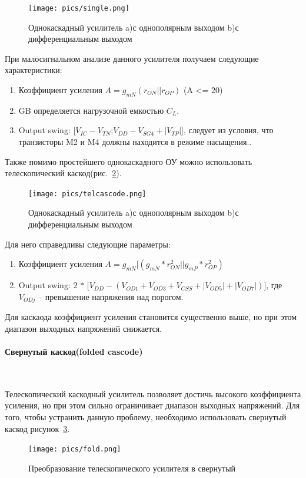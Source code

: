 \documentclass[a4paper,12pt,oneside]{scrartcl}
\begin{document}
\begin{figure}[!htb]
\centering
\texttt{[image: pics/single.png]}
\caption{Однокаскадный усилитель a)с однополярным выходом b)с дифференциальным выходом}
\label{fig:Single}
\end{figure}

При малосигнальном анализе данного усилителя получаем следующие характеристики:
\begin{enumerate}
    \item Коэффициент усиления $A = g_{mN}(r_{ON}||r_{OP})$  (A <= 20)
    \item GB определяется нагрузочной емкостью $C_{L}$. 
    \item Output swing: [$V_{IC}- V_{TN}$;$V_{DD}- V_{SG4}+|V_{TP} |$], следует из условия, что транзисторы M2 и M4 должны находится в режиме насыщения..~\cite{B8}
\end{enumerate}

Также помимо простейшего однокаскадного ОУ можно использовать телескопический каскод(рис.~\ref{fig:tel}).

\begin{figure}[!htb]
\centering
\texttt{[image: pics/telcascode.png]}
\caption{Однокаскадный усилитель a)с однополярным выходом b)с дифференциальным выходом}
\label{fig:tel}
\end{figure}
\FloatBarrier

Для него справедливы следующие параметры:
\begin{enumerate}
    \item Коэффициент усиления $A= g_{mN} [(g_{mN} * r_{ON}^2  ||g_{mP} * r_{OP}^2 )$
	\item Output swing: $2$ $*$ [$V_{DD}-(V_{OD1}+ V_{OD3}+ V_{CSS}+|V_{OD5} |+|V_{OD7} |)$], где $V_{ODj}$ – превышение напряжения над порогом. 
\end{enumerate}
Для каскаода коэффициент усиления становится существенно выше, но при этом диапазон выходных напряжений снижается.~\cite{B16}







\paragraph{Свернутый каскод(folded cascode)}~~~~~~~~~~~~~~~~~~~~~~~~~~~~~

Телескопический каскодный усилитель позволяет достичь высокого коэффициента усиления, но при этом сильно ограничивает диапазон выходных напряжений. Для того, чтобы устранить данную проблему, необходимо использовать свернутый каскод рисунок~\ref{fig:Fold}.~\cite{B5}
\begin{figure}[!htb]
\centering
\texttt{[image: pics/fold.png]}
\caption{Преобразование телескопического усилителя в свернутый}
\label{fig:Fold}
\end{figure}
\FloatBarrier
\end{document}
